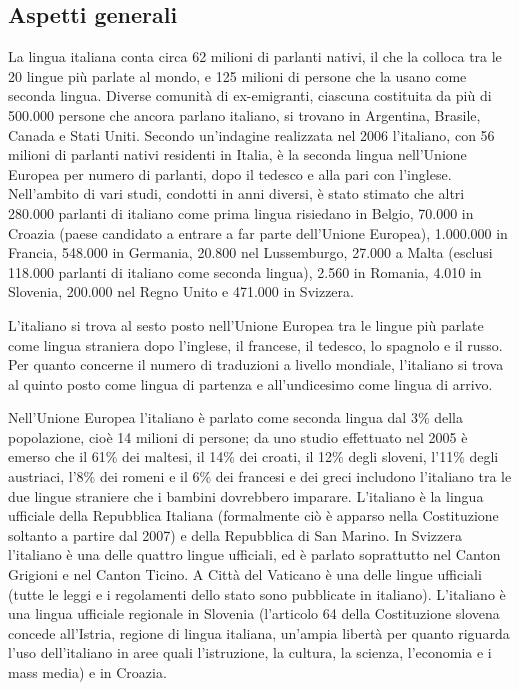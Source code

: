 \documentclass[]{../../metanetpaper}
\begin{document}
\begin{multicols}{2}

\subsection{Aspetti generali}

La lingua italiana conta circa 62 milioni di parlanti nativi, il che la colloca tra le 20 lingue pi\`{u} parlate al mondo, e 125 milioni di persone che la usano come seconda lingua. Diverse comunit\`{a} di ex-emigranti, ciascuna costituita da pi\`{u} di 500.000 persone che ancora parlano italiano, si trovano in Argentina, Brasile, Canada e Stati Uniti. Secondo un'indagine realizzata nel 2006 l'italiano,  con 56 milioni di parlanti nativi residenti in Italia, \`{e} la seconda lingua nell'Unione Europea per numero di parlanti, dopo il tedesco e alla pari con l'inglese. Nell'ambito di vari studi, condotti in anni diversi, \`{e} stato stimato che altri 280.000 parlanti di italiano come prima lingua risiedano in Belgio, 70.000 in Croazia (paese candidato a entrare a far parte dell'Unione Europea), 1.000.000 in Francia, 548.000 in Germania, 20.800 nel Lussemburgo, 27.000 a Malta (esclusi 118.000 parlanti di italiano come seconda lingua), 2.560 in Romania, 4.010 in Slovenia, 200.000 nel Regno Unito e 471.000 in Svizzera.



L'italiano si trova al sesto posto nell'Unione Europea tra le lingue pi\`{u} parlate come lingua straniera dopo l'inglese, il francese, il tedesco, lo spagnolo e il russo. Per quanto concerne il numero di traduzioni a livello mondiale, l'italiano si trova al quinto posto come lingua di partenza e all'undicesimo come lingua di arrivo. 

Nell'Unione Europea l'italiano \`{e} parlato come seconda lingua dal 3\% della popolazione, cio\`{e} 14 milioni di persone; da uno studio effettuato nel 2005 \`{e} emerso che il 61\% dei maltesi, il 14\% dei croati, il 12\% degli sloveni, l'11\% degli austriaci, l'8\% dei romeni e il 6\% dei francesi e dei greci includono l'italiano tra le due lingue straniere che i bambini dovrebbero imparare.
L'italiano \`{e} la lingua ufficiale della Repubblica Italiana (formalmente
ci\`{o} \`{e} apparso nella Costituzione soltanto a partire dal 2007) e della
Repubblica di San Marino. In Svizzera l'italiano \`{e} una delle quattro
lingue ufficiali, ed \`{e} parlato soprattutto nel Canton Grigioni e nel
Canton Ticino. A Citt\`{a} del Vaticano \`{e} una delle lingue ufficiali
(tutte le leggi e i regolamenti dello stato sono pubblicate in
italiano). L'italiano \`{e} una lingua ufficiale regionale in Slovenia
(l'articolo 64 della Costituzione slovena concede all'Istria, regione di
lingua italiana, un'ampia libert\`{a} per quanto riguarda l'uso dell'italiano
in aree quali l'istruzione, la cultura, la scienza, l'economia e i mass media)
e in Croazia. 



\end{multicols}
\end{document}
